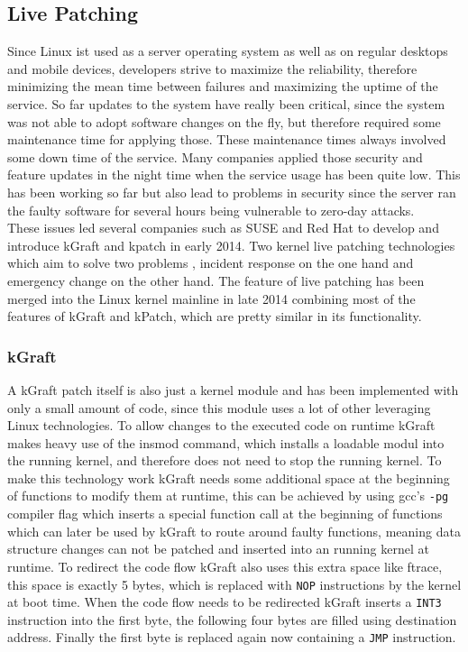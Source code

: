 \documentclass{sig-alternate-05-2015}
\begin{document}
\subsection{Live Patching}
Since Linux ist used as a server operating system as well as on regular desktops and mobile devices, developers strive to maximize the reliability, therefore minimizing the mean time between failures and maximizing the uptime of the service. So far updates to the system have really been critical, since the system was not able to adopt software changes on the fly, but therefore required some maintenance time for applying those. These maintenance times always involved some down time of the service. Many companies applied those security and feature updates in the night time when the service usage has been quite low. This has been working so far but also lead to problems in security since the server ran the faulty software for several hours being vulnerable to zero-day attacks. \\
These issues led several companies such as SUSE and Red Hat to develop and introduce kGraft and kpatch in early 2014. Two kernel live patching technologies which aim to solve two problems \cite{kgraft-1}, incident response on the one hand and emergency change on the other hand. The feature of live patching has been merged into the Linux kernel mainline in late 2014 combining most of the features of kGraft and kPatch, which are pretty similar in its functionality.

\subsubsection{kGraft}
A kGraft patch itself is also just a kernel module and has been implemented with only a small amount of code, since this module uses a lot of other leveraging Linux technologies. To allow changes to the executed code on runtime kGraft makes heavy use of the insmod command, which installs a loadable modul into the running kernel, and therefore does not need to stop the running kernel. To make this technology work kGraft needs some additional space at the beginning of functions to modify them at runtime, this can be achieved by using gcc's \texttt{-pg} compiler flag which inserts a special function call at the beginning of functions which can later be used by kGraft to route around faulty functions, meaning data structure changes can not be patched and inserted into an running kernel at runtime. To redirect the code flow kGraft also uses this extra space like ftrace, this space is exactly 5 bytes, which is replaced with \texttt{NOP} instructions by the kernel at boot time. When the code flow needs to be redirected kGraft inserts a \texttt{INT3} instruction into the first byte, the following four bytes are filled using destination address. Finally the first byte is replaced again now containing a \texttt{JMP} instruction.
\end{document}
